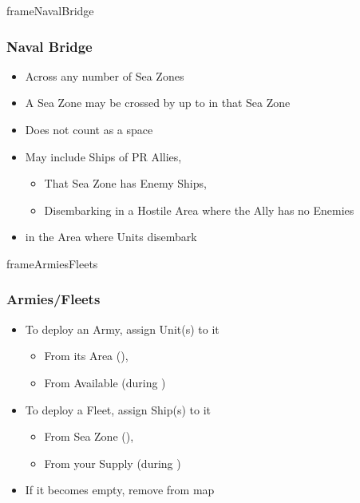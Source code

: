\documentclass[10pt]{article}
\newlength{\fhArmiesFleets} \setlength\fhArmiesFleets{8\baselineskip}
\newlength{\fhNavalBridge} \setlength\fhNavalBridge{11\baselineskip}
\begin{document}
\begin{dynamiccontents*}{frameNavalBridge}\begin{eubox}{\fhNavalBridge}
	\subsubsection*{Naval Bridge }
	\begin{itemize}
		\item Across any number of Sea Zones
		\item A Sea Zone may be crossed by up to  in that Sea Zone
		\item Does not count as a space
		\item May include Ships of PR Allies, 
		\begin{itemize}
			\item That Sea Zone has Enemy Ships, 
			\item Disembarking in a Hostile Area where the Ally has no Enemies
		\end{itemize}
		\item {} in the Area where Units disembark
	\end{itemize}
\end{eubox}\end{dynamiccontents*}

\begin{dynamiccontents*}{frameArmiesFleets}\begin{eubox}{\fhArmiesFleets}
	\subsubsection*{Armies/Fleets }
	\begin{itemize}
		\item To deploy an Army, assign Unit(s) to it 
		\begin{itemize}
			\item From its Area (), 
			\item From Available \manpower (during )
		\end{itemize}
		\item To deploy a Fleet, assign Ship(s) to it
		\begin{itemize}
			\item From Sea Zone (), 
			\item From your Supply (during )
		\end{itemize}
		\item If it becomes empty, remove from map
	\end{itemize}
\end{eubox}\end{dynamiccontents*}
\end{document}
